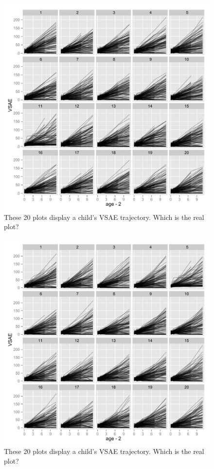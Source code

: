 \documentclass{article} %
\begin{document}
\begin{figure}
	\centering
	\includegraphics[width=\textwidth]{autism_ranef1_true11.pdf}
	\caption{\label{fig:lineup-ranef1} These 20 plots display a child's VSAE trajectory. Which is the real plot?}
\end{figure}

\begin{figure}
	\centering
	\includegraphics[width=\textwidth]{autism_ranef2_true5.pdf}
	\caption{\label{fig:lineup-ranef2} These 20 plots display a child's VSAE trajectory. Which is the real plot?}
\end{figure}
\end{document}
